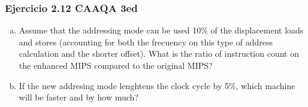 \documentclass{beamer}
\begin{document}
\begin{frame}[fragile]
 \frametitle{Ejercicio 2.12 CAAQA 3ed}
\begin{enumerate}[a.]
 \item Assume that the addressing mode can be used 10\% of the displacement loads and stores (accounting for both the frecuency on this type of address calculation and the shorter offset). What is the ratio of instruction count on the enhanced MIPS compared to the original MIPS?
\item If the new addresing mode lenghtens the clock cycle by 5\%, which machine will be faster and by how much?
\end{enumerate}

\end{frame}
\end{document}
